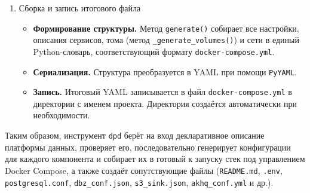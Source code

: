 \begin{enumerate}[1.]
    \item Сборка и запись итогового файла
          \begin{itemize}
              \item \textbf{Формирование структуры.} Метод \texttt{generate()} собирает все настройки, описания сервисов, тома (метод \texttt{\_generate\_volumes()}) и сети в единый Python-словарь, соответствующий формату \texttt{docker-compose.yml}.
              \item \textbf{Сериализация.} Структура преобразуется в YAML при помощи \texttt{PyYAML}.
              \item \textbf{Запись.} Итоговый YAML записывается в файл \texttt{docker-compose.yml} в директории с именем проекта. Директория создаётся автоматически при необходимости.
          \end{itemize}
\end{enumerate}

Таким образом, инструмент \texttt{dpd} берёт на вход декларативное описание платформы данных, проверяет его, последовательно генерирует конфигурации для каждого компонента и собирает их в готовый к запуску стек под управлением Docker Compose, а также создаёт сопутствующие файлы (\texttt{README.md}, \texttt{.env}, \texttt{postgresql.conf}, \texttt{dbz\_conf.json}, \texttt{s3\_sink.json}, \texttt{akhq\_conf.yml} и др.).




%
